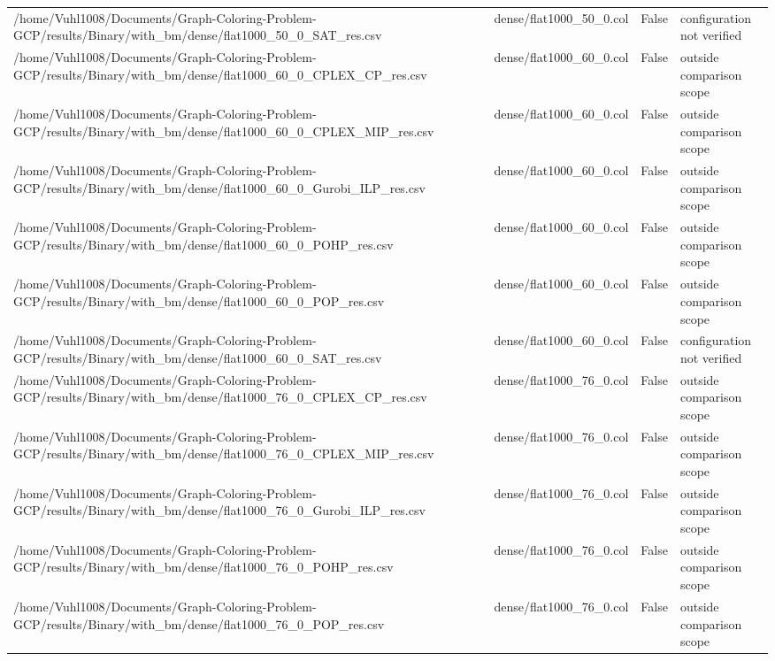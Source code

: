 \begin{table}[htbp]
\begin{tabular}{llll}
/home/Vuhl1008/Documents/Graph-Coloring-Problem-GCP/results/Binary/with\_bm/dense/flat1000\_50\_0\_SAT\_res.csv & dense/flat1000\_50\_0.col & False & configuration not verified \\
/home/Vuhl1008/Documents/Graph-Coloring-Problem-GCP/results/Binary/with\_bm/dense/flat1000\_60\_0\_CPLEX\_CP\_res.csv & dense/flat1000\_60\_0.col & False & outside comparison scope \\
/home/Vuhl1008/Documents/Graph-Coloring-Problem-GCP/results/Binary/with\_bm/dense/flat1000\_60\_0\_CPLEX\_MIP\_res.csv & dense/flat1000\_60\_0.col & False & outside comparison scope \\
/home/Vuhl1008/Documents/Graph-Coloring-Problem-GCP/results/Binary/with\_bm/dense/flat1000\_60\_0\_Gurobi\_ILP\_res.csv & dense/flat1000\_60\_0.col & False & outside comparison scope \\
/home/Vuhl1008/Documents/Graph-Coloring-Problem-GCP/results/Binary/with\_bm/dense/flat1000\_60\_0\_POHP\_res.csv & dense/flat1000\_60\_0.col & False & outside comparison scope \\
/home/Vuhl1008/Documents/Graph-Coloring-Problem-GCP/results/Binary/with\_bm/dense/flat1000\_60\_0\_POP\_res.csv & dense/flat1000\_60\_0.col & False & outside comparison scope \\
/home/Vuhl1008/Documents/Graph-Coloring-Problem-GCP/results/Binary/with\_bm/dense/flat1000\_60\_0\_SAT\_res.csv & dense/flat1000\_60\_0.col & False & configuration not verified \\
/home/Vuhl1008/Documents/Graph-Coloring-Problem-GCP/results/Binary/with\_bm/dense/flat1000\_76\_0\_CPLEX\_CP\_res.csv & dense/flat1000\_76\_0.col & False & outside comparison scope \\
/home/Vuhl1008/Documents/Graph-Coloring-Problem-GCP/results/Binary/with\_bm/dense/flat1000\_76\_0\_CPLEX\_MIP\_res.csv & dense/flat1000\_76\_0.col & False & outside comparison scope \\
/home/Vuhl1008/Documents/Graph-Coloring-Problem-GCP/results/Binary/with\_bm/dense/flat1000\_76\_0\_Gurobi\_ILP\_res.csv & dense/flat1000\_76\_0.col & False & outside comparison scope \\
/home/Vuhl1008/Documents/Graph-Coloring-Problem-GCP/results/Binary/with\_bm/dense/flat1000\_76\_0\_POHP\_res.csv & dense/flat1000\_76\_0.col & False & outside comparison scope \\
/home/Vuhl1008/Documents/Graph-Coloring-Problem-GCP/results/Binary/with\_bm/dense/flat1000\_76\_0\_POP\_res.csv & dense/flat1000\_76\_0.col & False & outside comparison scope \\

\end{tabular}
\end{table}

